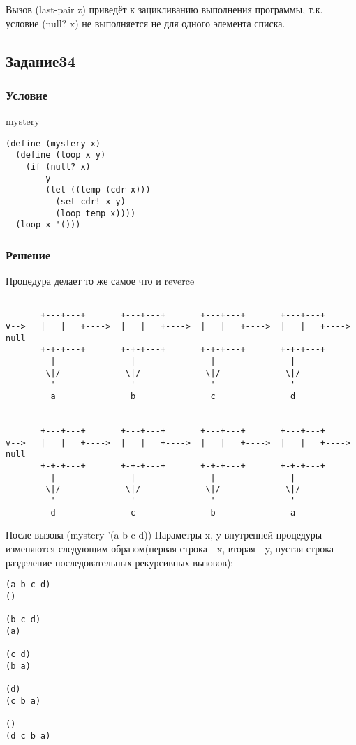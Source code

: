 \documentclass[10pt,a4paper]{article}
\begin{document}
Вызов (last-pair z) приведёт к зацикливанию выполнения программы,
т.к. условие (null? x) не выполняется не для одного элемента списка.

\subsection*{Задание34}
\subsubsection*{Условие}
mystery
\begin{lstlisting}
(define (mystery x)
  (define (loop x y)
    (if (null? x)
        y
        (let ((temp (cdr x)))
          (set-cdr! x y)
          (loop temp x))))
  (loop x '()))
\end{lstlisting}
\subsubsection*{Решение}
Процедура делает то же самое что и reverce

\begin{lstlisting}

       +---+---+       +---+---+       +---+---+       +---+---+
v-->   |   |   +---->  |   |   +---->  |   |   +---->  |   |   +---->  null
       +-+-+---+       +-+-+---+       +-+-+---+       +-+-+---+
         |               |               |               |
        \|/             \|/             \|/             \|/
         '               '               '               '
         a               b               c               d


       +---+---+       +---+---+       +---+---+       +---+---+
v-->   |   |   +---->  |   |   +---->  |   |   +---->  |   |   +----> null
       +-+-+---+       +-+-+---+       +-+-+---+       +-+-+---+
         |               |               |               |
        \|/             \|/             \|/             \|/
         '               '               '               '
         d               c               b               a

\end{lstlisting}
После вызова (mystery '(a b c d))  Параметры x, y внутренней процедуры
изменяются следующим образом(первая строка - x, вторая - y, пустая строка
- разделение последовательных рекурсивных вызовов): \\
\begin{lstlisting}
(a b c d)
()

(b c d)
(a)

(c d)
(b a)

(d)
(c b a)

()
(d c b a)
\end{lstlisting}
\end{document}
